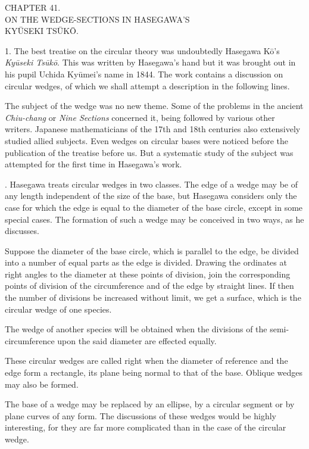 \documentclass[11pt]{article}
\newcommand{\scanpage}[2]{\clearpage\setcounter{footnote}{0}\noindent{\footnotesize\color{gray}PDF page #1 · #2}\par\medskip}
\begin{document}
\begin{center}
CHAPTER 41.\\[1mm]
ON THE WEDGE-SECTIONS IN HASEGAWA'S\\
KYŪSEKI TSŪKŌ.
\end{center}

1. The best treatise on the circular theory was undoubtedly Hasegawa Kō's \emph{Kyūseki Tsūkō}. This was written by Hasegawa's hand but it was brought out in his pupil Uchida Kyūmei's name in 1844. The work contains a discussion on circular wedges, of which we shall attempt a description in the following lines.

The subject of the wedge was no new theme. Some of the problems in the ancient \emph{Chiu-chang} or \emph{Nine Sections} concerned it, being followed by various other writers. Japanese mathematicians of the 17th and 18th centuries also extensively studied allied subjects. Even wedges on circular bases were noticed before the publication of the treatise before us. But a systematic study of the subject was attempted for the first time in Hasegawa's work.

\scanpage{0299}{printed page 285}
2. Hasegawa treats circular wedges in two classes. The edge of a wedge may be of any length independent of the size of the base, but Hasegawa considers only the case for which the edge is equal to the diameter of the base circle, except in some special cases. The formation of such a wedge may be conceived in two ways, as he discusses.

Suppose the diameter of the base circle, which is parallel to the edge, be divided into a number of equal parts as the edge is divided. Drawing the ordinates at right angles to the diameter at these points of division, join the corresponding points of division of the circumference and of the edge by straight lines. If then the number of divisions be increased without limit, we get a surface, which is the circular wedge of one species.

The wedge of another species will be obtained when the divisions of the semi-circumference upon the said diameter are effected equally.

These circular wedges are called right when the diameter of reference and the edge form a rectangle, its plane being normal to that of the base. Oblique wedges may also be formed.

The base of a wedge may be replaced by an ellipse, by a circular segment or by plane curves of any form. The discussions of these wedges would be highly interesting, for they are far more complicated than in the case of the circular wedge.
\end{document}
